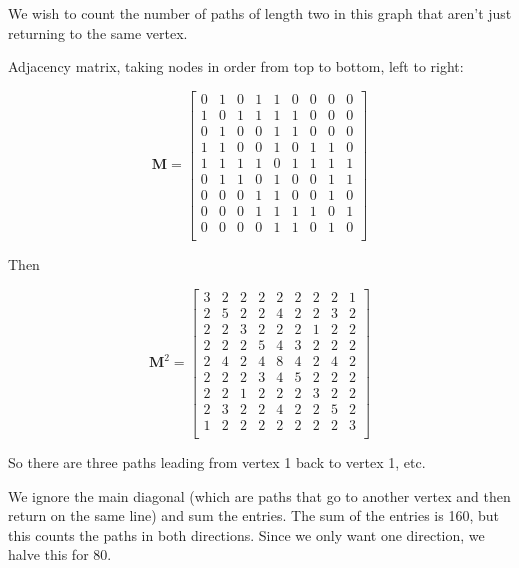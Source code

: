 \documentclass{article}
\begin{document}
    
    We wish to count the number of paths of length two in this graph that aren't just returning to the same vertex.
    
    \begin{center}
    \end{center}
    
    Adjacency matrix, taking nodes in order from top to bottom, left to right:
    
    \[\mathbf{M} = \begin{bmatrix}
        0 & 1 & 0 & 1 & 1 & 0 & 0 & 0 & 0\\
        1 & 0 & 1 & 1 & 1 & 1 & 0 & 0 & 0\\
        0 & 1 & 0 & 0 & 1 & 1 & 0 & 0 & 0\\
        1 & 1 & 0 & 0 & 1 & 0 & 1 & 1 & 0\\
        1 & 1 & 1 & 1 & 0 & 1 & 1 & 1 & 1\\
        0 & 1 & 1 & 0 & 1 & 0 & 0 & 1 & 1\\
        0 & 0 & 0 & 1 & 1 & 0 & 0 & 1 & 0\\
        0 & 0 & 0 & 1 & 1 & 1 & 1 & 0 & 1\\
        0 & 0 & 0 & 0 & 1 & 1 & 0 & 1 & 0\\
    \end{bmatrix}\]
    
    Then
    
    \[\mathbf{M}^2 = \begin{bmatrix}
        3 & 2 & 2 & 2 & 2 & 2 & 2 & 2 & 1\\
        2 & 5 & 2 & 2 & 4 & 2 & 2 & 3 & 2\\
        2 & 2 & 3 & 2 & 2 & 2 & 1 & 2 & 2\\
        2 & 2 & 2 & 5 & 4 & 3 & 2 & 2 & 2\\
        2 & 4 & 2 & 4 & 8 & 4 & 2 & 4 & 2\\
        2 & 2 & 2 & 3 & 4 & 5 & 2 & 2 & 2\\
        2 & 2 & 1 & 2 & 2 & 2 & 3 & 2 & 2\\
        2 & 3 & 2 & 2 & 4 & 2 & 2 & 5 & 2\\
        1 & 2 & 2 & 2 & 2 & 2 & 2 & 2 & 3\\
    \end{bmatrix}\]
    
    So there are three paths leading from vertex 1 back to vertex 1, etc. 
    
    We ignore the main diagonal (which are paths that go to another vertex and then return on the same line) and sum the entries. The sum of the entries is 160, but this counts the paths in both directions. Since we only want one direction, we halve this for 80.
    
    
\end{document}
